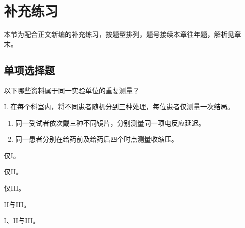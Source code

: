 \clearpage\section{补充练习}

本节为配合正文新编的补充练习，按题型排列，题号接续本章往年题，解析见章末。

\subsection{单项选择题}

\par\addvspace{6pt}\noindent\begin{minipage}{\linewidth}


以下哪些资料属于同一实验单位的重复测量？

I. 在每个科室内，将不同患者随机分到三种处理，每位患者仅测量一次结局。

\begin{enumerate}
\def\labelenumi{\Roman{enumi}.}
\setcounter{enumi}{1}
\item
  同一受试者依次戴三种不同镜片，分别测量同一项电反应延迟。
\item
  同一患者分别在给药前及给药后四个时点测量收缩压。
\end{enumerate}


\begin{choices}

\item 仅I。

\item 仅II。

\item 仅III。

\item II与III。

\item I、II与III。

\end{choices}

\end{minipage}\par\vspace{4pt}

